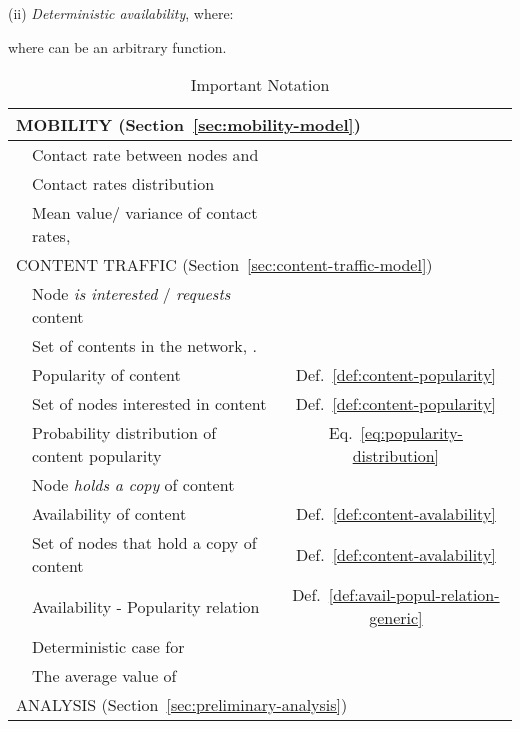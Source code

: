 \documentclass[journal]{IEEEtran}
\newcommand{\eq}[1]{Eq.~\eqref{#1}}
\begin{document}
(ii) \textit{Deterministic availability}, where:

where  can be an arbitrary function.  


\begin{table}
 \centering
 \caption{Important Notation}
\begin{scriptsize}
\begin{tabular}{|l|l|c|}
\hline 
\multicolumn{3}{|l|}{MOBILITY (Section~\ref{sec:mobility-model})}\\
\hline
	& Contact rate between nodes  and  &{}\\
\hline
		& Contact rates distribution & {}\\
\hline
	& Mean value/ variance of contact rates, & {}\\
\hline
\multicolumn{3}{|l|}{CONTENT TRAFFIC (Section~\ref{sec:content-traffic-model})}\\
\hline
		& Node  \textit{is interested} / \textit{requests} content  &{}\\
\hline
		& Set of contents in the network, . &{}\\
\hline
	& Popularity of content  &{Def.~\ref{def:content-popularity}}\\
\hline
		& Set of nodes interested in content  &{Def.~\ref{def:content-popularity}}\\
\hline
		& Probability distribution of content popularity &\eq{eq:popularity-distribution} \\
\hline
 &  Node  \textit{holds a copy} of content  &{}\\
\hline
	& Availability of content  &{Def.~\ref{def:content-avalability}}\\
\hline
		& Set of nodes that hold a copy of content  &{Def.~\ref{def:content-avalability}}\\
\hline
	& Availability - Popularity relation &{Def.~\ref{def:avail-popul-relation-generic}}\\
\hline
	& Deterministic case for &{}\\
\hline
	&The average value of &{}\\
\hline
\multicolumn{3}{|l|}{ANALYSIS (Section~\ref{sec:preliminary-analysis})}\\

\end{tabular}
\end{scriptsize}
\end{table}
\end{document}
